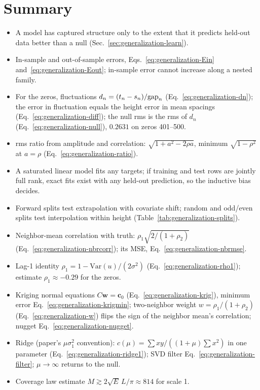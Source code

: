\section{Summary}\label{sec:generalization-summary}

\begin{itemize}
\item A model has captured structure only to the extent that it predicts held-out data better than a null (Sec.~\ref{sec:generalization-learn}).
\item In-sample and out-of-sample errors, Eqs.~\eqref{eq:generalization-Ein} and~\eqref{eq:generalization-Eout}; in-sample error cannot increase along a nested family.
\item For the zeros, fluctuations $d_n=(t_n-s_n)/\mathrm{gap}_n$ (Eq.~\eqref{eq:generalization-dn}); the error in fluctuation equals the height error in mean spacings (Eq.~\eqref{eq:generalization-diff}); the null rms is the rms of $d_n$ (Eq.~\eqref{eq:generalization-null}), $0.2631$ on zeros 401--500.
\item rms ratio from amplitude and correlation: $\sqrt{1+a^2-2\rho a}$, minimum $\sqrt{1-\rho^2}$ at $a=\rho$ (Eq.~\eqref{eq:generalization-ratio}).
\item A saturated linear model fits any targets; if training and test rows are jointly full rank, exact fits exist with any held-out prediction, so the inductive bias decides.
\item Forward splits test extrapolation with covariate shift; random and odd/even splits test interpolation within height (Table~\ref{tab:generalization-splits}).
\item Neighbor-mean correlation with truth: $\rho_1\sqrt{2/(1+\rho_2)}$ (Eq.~\eqref{eq:generalization-nbrcorr}); its MSE, Eq.~\eqref{eq:generalization-nbrmse}.
\item Lag-1 identity $\rho_1=1-\mathrm{Var}(u)/(2\sigma^2)$ (Eq.~\eqref{eq:generalization-rho1}); estimate $\rho_1\approx-0.29$ for the zeros.
\item Kriging normal equations $C\bm w=\bm c_0$ (Eq.~\eqref{eq:generalization-krig}), minimum error Eq.~\eqref{eq:generalization-krigmin}; two-neighbor weight $w=\rho_1/(1+\rho_2)$ (Eq.~\eqref{eq:generalization-w}) flips the sign of the neighbor mean's correlation; nugget Eq.~\eqref{eq:generalization-nugget}.
\item Ridge (paper's $\mu\sigma_1^2$ convention): $c(\mu)=\sum xy/((1+\mu)\sum x^2)$ in one parameter (Eq.~\eqref{eq:generalization-ridge1}); SVD filter Eq.~\eqref{eq:generalization-filter}; $\mu\to\infty$ returns to the null.
\item Coverage law estimate $M\gtrsim2\sqrt E\,L/\pi\approx814$ for scale 1.
\end{itemize}

